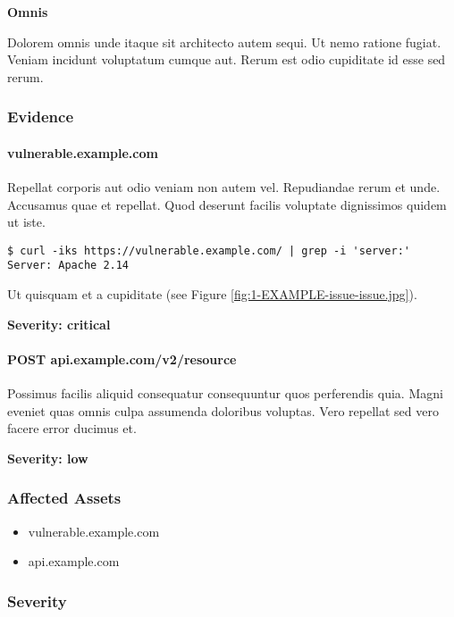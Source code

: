\documentclass[a4paper]{article}
\def\tightlist{}
\begin{document}
\textbf{Omnis}

Dolorem omnis unde itaque sit architecto autem sequi.
Ut nemo ratione fugiat.
Veniam incidunt voluptatum cumque aut.
Rerum est odio cupiditate id esse sed rerum.


    \subsubsection{Evidence}

          \paragraph{vulnerable.example.com}

      Repellat corporis aut odio veniam non autem vel.
Repudiandae rerum et unde. Accusamus quae et repellat.
Quod deserunt facilis voluptate dignissimos quidem ut iste.

\begin{lstlisting}
$ curl -iks https://vulnerable.example.com/ | grep -i 'server:'
Server: Apache 2.14
\end{lstlisting}

Ut quisquam et a cupiditate (see Figure \ref{fig:1-EXAMPLE-issue-issue.jpg}).

\textbf{Severity: critical}

          \paragraph{POST api.example.com/v2/resource}

      Possimus facilis aliquid consequatur consequuntur quos perferendis quia.
Magni eveniet quas omnis culpa assumenda doloribus voluptas.
Vero repellat sed vero facere error ducimus et.

\textbf{Severity: low}

    
    \subsubsection{Affected Assets}

    \begin{itemize}
\tightlist
\item
  vulnerable.example.com
\item
  api.example.com
\end{itemize}


    \subsubsection{Severity}
\end{document}
